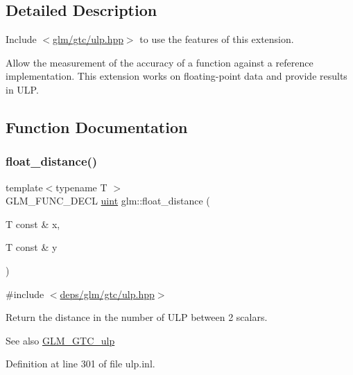 \subsection{Detailed Description}
Include $<$\hyperlink{ulp_8hpp}{glm/gtc/ulp.\+hpp}$>$ to use the features of this extension.

Allow the measurement of the accuracy of a function against a reference implementation. This extension works on floating-\/point data and provide results in U\+LP. 

\subsection{Function Documentation}
\mbox{\label{group__gtc__ulp_ga2e09bd6c8b0a9c91f6f5683d68245634}} 
\subsubsection{\texorpdfstring{float\+\_\+distance()}{float\_distance()}\hspace{0.1cm}{\footnotesize\ttfamily [1/2]}}
{\footnotesize\ttfamily template$<$typename T $>$ \\
G\+L\+M\+\_\+\+F\+U\+N\+C\+\_\+\+D\+E\+CL \hyperlink{group__core__precision_ga4fd29415871152bfb5abd588334147c8}{uint} glm\+::float\+\_\+distance (\begin{DoxyParamCaption}\item[{T const \&}]{x,  }\item[{T const \&}]{y }\end{DoxyParamCaption})}



{\ttfamily \#include $<$\hyperlink{ulp_8hpp}{deps/glm/gtc/ulp.\+hpp}$>$}

Return the distance in the number of U\+LP between 2 scalars. \begin{DoxySeeAlso}{See also}
\hyperlink{group__gtc__ulp}{G\+L\+M\+\_\+\+G\+T\+C\+\_\+ulp} 
\end{DoxySeeAlso}


Definition at line 301 of file ulp.\+inl.

\mbox{\label{group__gtc__ulp_ga72b3223069013f336d8c31812b7ada80}} 
